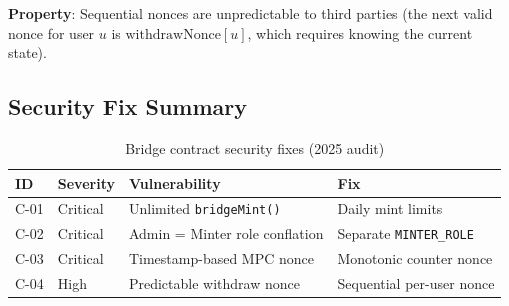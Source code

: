 \textbf{Property}: Sequential nonces are unpredictable to third parties (the next valid nonce for user $u$ is $\text{withdrawNonce}[u]$, which requires knowing the current state).

\subsection{Security Fix Summary}

\begin{table}[h]
\centering
\begin{tabular}{llll}
\toprule
\textbf{ID} & \textbf{Severity} & \textbf{Vulnerability} & \textbf{Fix} \\
\midrule
C-01 & Critical & Unlimited \texttt{bridgeMint()} & Daily mint limits \\
C-02 & Critical & Admin = Minter role conflation & Separate \texttt{MINTER\_ROLE} \\
C-03 & Critical & Timestamp-based MPC nonce & Monotonic counter nonce \\
C-04 & High & Predictable withdraw nonce & Sequential per-user nonce \\
\bottomrule
\end{tabular}
\caption{Bridge contract security fixes (2025 audit)}
\label{tab:security-fixes}
\end{table}

